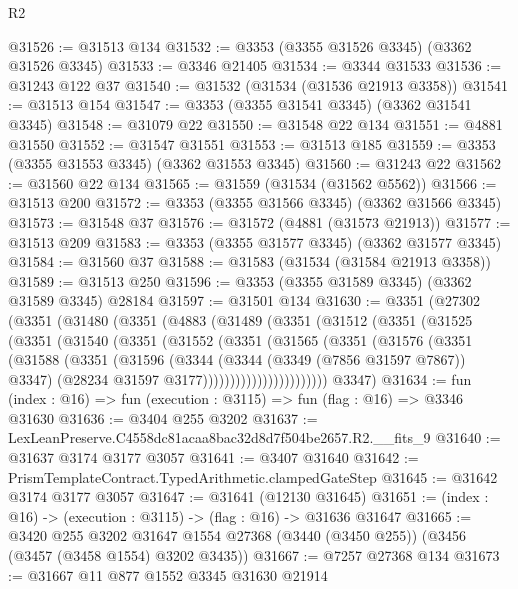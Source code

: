 \begin{lexlean}{R2}
\begin{coremodule}
@31526 := @31513 @134
@31532 := @3353 (@3355 @31526 @3345) (@3362 @31526 @3345)
@31533 := @3346 @21405
@31534 := @3344 @31533
@31536 := @31243 @122 @37
@31540 := @31532 (@31534 (@31536 @21913 @3358))
@31541 := @31513 @154
@31547 := @3353 (@3355 @31541 @3345) (@3362 @31541 @3345)
@31548 := @31079 @22
@31550 := @31548 @22 @134
@31551 := @4881 @31550
@31552 := @31547 @31551
@31553 := @31513 @185
@31559 := @3353 (@3355 @31553 @3345) (@3362 @31553 @3345)
@31560 := @31243 @22
@31562 := @31560 @22 @134
@31565 := @31559 (@31534 (@31562 @5562))
@31566 := @31513 @200
@31572 := @3353 (@3355 @31566 @3345) (@3362 @31566 @3345)
@31573 := @31548 @37
@31576 := @31572 (@4881 (@31573 @21913))
@31577 := @31513 @209
@31583 := @3353 (@3355 @31577 @3345) (@3362 @31577 @3345)
@31584 := @31560 @37
@31588 := @31583 (@31534 (@31584 @21913 @3358))
@31589 := @31513 @250
@31596 := @3353 (@3355 @31589 @3345) (@3362 @31589 @3345) @28184
@31597 := @31501 @134
@31630 := @3351
    (@27302
      (@3351
        (@31480
          (@3351
            (@4883
              (@31489
                (@3351
                  (@31512
                    (@3351
                      (@31525
                        (@3351
                          (@31540
                            (@3351
                              (@31552
                                (@3351
                                  (@31565
                                    (@3351
                                      (@31576
                                        (@3351
                                          (@31588
                                            (@3351
                                              (@31596
                                                (@3344
                                                  (@3344 (@3349 (@7856 @31597 @7867)) @3347)
                                                  (@28234 @31597 @3177)))))))))))))))))))))))
      @3347)
@31634 := fun (index : @16) => fun (execution : @3115) => fun (flag : @16) => @3346 @31630
@31636 := @3404 @255 @3202
@31637 := LexLeanPreserve.C4558dc81acaa8bac32d8d7f504be2657.R2.__fits_9
@31640 := @31637 @3174 @3177 @3057
@31641 := @3407 @31640
@31642 := PrismTemplateContract.TypedArithmetic.clampedGateStep
@31645 := @31642 @3174 @3177 @3057
@31647 := @31641 (@12130 @31645)
@31651 := (index : @16) -> (execution : @3115) -> (flag : @16) -> @31636 @31647
@31665 := @3420
    @255
    @3202
    @31647
    @1554
    @27368
    (@3440 (@3450 @255))
    (@3456 (@3457 (@3458 @1554) @3202 @3435))
@31667 := @7257 @27368 @134
@31673 := @31667 @11 @877 @1552 @3345 @31630 @21914

\end{coremodule}
\end{lexlean}
